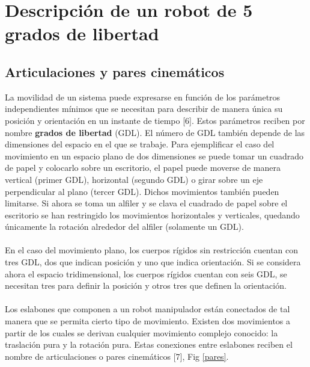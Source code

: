 

\chapter{\textcolor{Azul}{Descripción de un robot de 5 grados de libertad}}

\section{Articulaciones y pares cinemáticos}

La movilidad de un sistema puede expresarse en función de los parámetros independientes mínimos que se necesitan para describir de manera única su posición y orientación en un instante de tiempo [6]. Estos parámetros reciben por nombre \textbf{grados de libertad} (GDL). El número de GDL también depende de las dimensiones del espacio en el que se trabaje. Para ejemplificar el caso del movimiento en un espacio plano de dos dimensiones se puede tomar un cuadrado de papel y colocarlo sobre un escritorio, el papel puede moverse de manera vertical (primer GDL), horizontal (segundo GDL) o girar sobre un eje perpendicular al plano (tercer GDL). Dichos movimientos también pueden limitarse. Si ahora se toma un alfiler y se clava el cuadrado de papel sobre el escritorio se han restringido los movimientos horizontales y verticales, quedando únicamente la rotación alrededor del alfiler (solamente un GDL).\\\\En el caso del movimiento plano, los cuerpos rígidos sin restricción cuentan con tres GDL, dos que indican posición y uno que indica orientación. Si se considera ahora el espacio tridimensional, los cuerpos rígidos cuentan con seis GDL, se necesitan tres para definir la posición y otros tres que definen la orientación. \\

\\Los eslabones que componen a un robot manipulador están conectados de tal manera que se permita cierto tipo de movimiento. Existen dos movimientos a partir de los cuales se derivan cualquier movimiento complejo conocido: la traslación pura y la rotación pura. Estas conexiones entre eslabones reciben el nombre de articulaciones o pares cinemáticos [7], Fig \ref{pares}.

